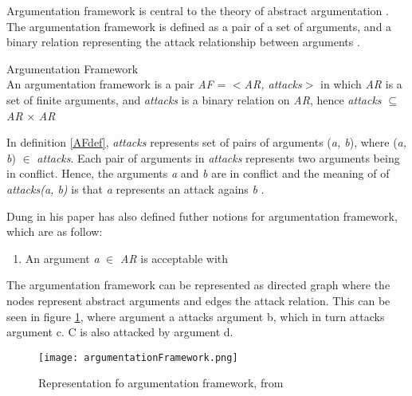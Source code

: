 Argumentation framework is central to the theory of abstract argumentation \cite{baroni2011introduction}. The argumentation framework is defined as a pair of a set of arguments, and a binary relation representing the attack relationship between arguments \cite{dung1995}. 

\theoremstyle{definition}
\begin{definition}{Argumentation Framework}
\label{AFdef}\\
An argumentation framework is a pair \textit{AF} = $<$\textit{AR, attacks}$>$ in which \textit{AR} is a set of finite arguments, and \textit{attacks} is a binary relation on \textit{AR}, hence \textit{attacks} $\subseteq$ \textit{AR} $\times$ \textit{AR}
\end{definition}

In definition \ref{AFdef}, \textit{attacks} represents set of pairs of arguments (\textit{a, b}), where (\textit{a, b}) $\in$ \textit{attacks}. Each pair of arguments in \textit{attacks} represents two arguments being in conflict. Hence, the arguments \textit{a} and \textit{b} are in conflict and the meaning of of \textit{attacks(a, b)} is that \textit{a} represents an attack agains \textit{b} \cite{dung1995}.

Dung in his paper \cite{dung1995} has also defined futher notions for argumentation framework, which are as follow:
\begin{enumerate}
	\item{An argument \textit{a} $\in$ \textit{AR} is acceptable with }
\end{enumerate}

The argumentation framework can be represented as directed graph where the nodes represent abstract arguments and edges the attack relation. This can be seen in figure \ref{fig:argumentationFrameworkFigure}, where argument a attacks argument b, which in turn attacks argument c. C is also attacked by argument d.

\begin{figure}[h]
	\centering
	\texttt{[image: argumentationFramework.png]}
	\caption{Representation fo argumentation framework, from \cite{argumentationFrameworkExample}}
	\label{fig:argumentationFrameworkFigure}
\end{figure}


